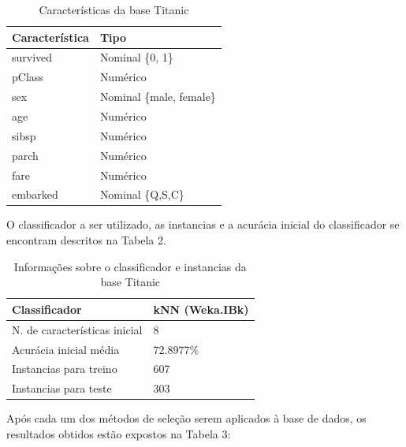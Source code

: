 \begin{table}[H]
\centering
\caption{Características da base Titanic}
\label{my-label}
\begin{tabular}{|l|l|}
\hline
\textbf{Característica} & \textbf{Tipo}            \\ \hline
survived                & Nominal \{0, 1\}         \\ \hline
pClass                  & Numérico                 \\ \hline
sex                     & Nominal \{male, female\} \\ \hline
age                     & Numérico                 \\ \hline
sibsp                   & Numérico                 \\ \hline
parch                   & Numérico                 \\ \hline
fare                    & Numérico                 \\ \hline
embarked                & Nominal \{Q,S,C\}        \\ \hline
\end{tabular}
\end{table}

O classificador a ser utilizado, as instancias e a acurácia inicial do classificador se encontram descritos na Tabela 2.

\begin{table}[H]
\centering
\caption{Informações sobre o classificador e instancias da base Titanic}
\label{my-label}
\begin{tabular}{|l|l|}
\hline
\textbf{Classificador}        & \multicolumn{1}{c|}{\textbf{kNN (Weka.IBk)}} \\ \hline
N. de características inicial & 8                                            \\ \hline
Acurácia inicial média        & 72.8977\%                                   \\ \hline
Instancias para treino        & 607                                          \\ \hline
Instancias para teste         & 303                                           \\ \hline
\end{tabular}
\end{table}

Após cada um dos métodos de seleção serem aplicados à base de dados, os resultados obtidos estão expostos na Tabela 3:

